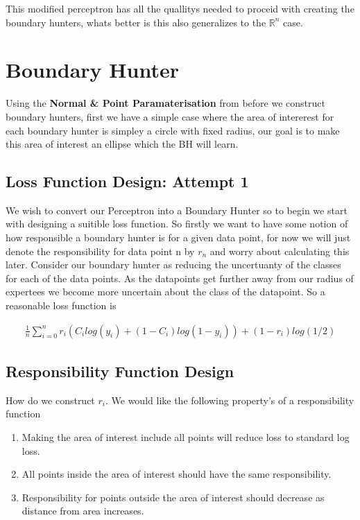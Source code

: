 \documentclass{article}
\begin{document}
This modified perceptron has all the quallitys needed to proceid with creating the boundary hunters, whats better is this also generalizes to the $\mathbb{R}^n$ case.

\section{Boundary Hunter}
Using the \textbf{Normal \& Point Paramaterisation} from before we construct boundary hunters, first we have a simple case where the area of intererest for each boundary hunter is simpley a circle with fixed radius, our goal is to make this area of interest an ellipse which the BH will learn.

\subsection{Loss Function Design: Attempt 1}
We wish to convert our Perceptron into a Boundary Hunter so to begin we start with designing a suitible loss function. So firstly we want to have some notion of how responsible a boundary hunter is for a given data point, for now we will just denote the responsibility for data point n by $r_n$ and worry about calculating this later. Consider our boundary hunter as reducing the uncertuanty of the classes for each of the data points. As the datapoints get further away from our radius of expertees we become more uncertain about the class of the datapoint. So a reasonable loss function is 

\begin{align}
\frac{1}{n} \sum_{i=0}^n r_i(C_i log(y_i) + (1-C_i)log(1-y_i)) + (1-r_i) log(1/2)
\end{align}


\subsection{Responsibility Function Design}
How do we construct $r_i$. We would like the following property's of a responsibility function

\begin{enumerate}
\item Making the area of interest include all points will reduce loss to standard log loss.
\item All points inside the area of interest should have the same responsibility.
\item Responsibility for points outside the area of interest should decrease as distance from area increases.
\end{enumerate}
\end{document}
